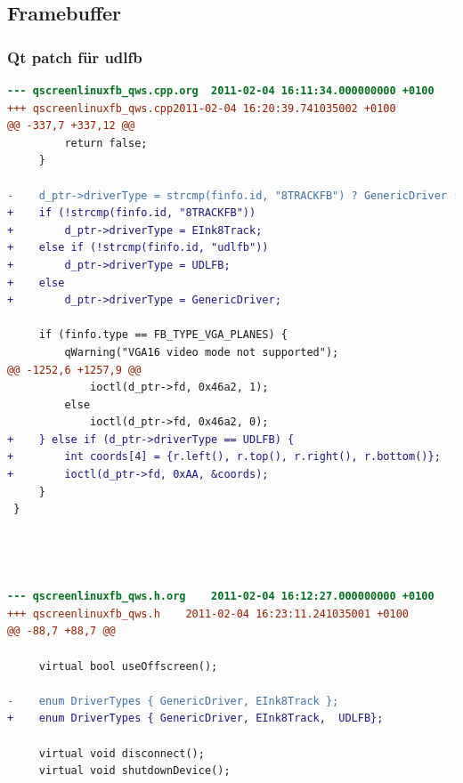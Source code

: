 \documentclass{beamer}
\begin{document}
  \subsection{Framebuffer}
	\begin{frame}
		\frametitle{Qt patch für udlfb}
		\begin{lstlisting}[language=diff, basicstyle=\tiny]
--- qscreenlinuxfb_qws.cpp.org	2011-02-04 16:11:34.000000000 +0100
+++ qscreenlinuxfb_qws.cpp2011-02-04 16:20:39.741035002 +0100
@@ -337,7 +337,12 @@
         return false;
     }
 
-    d_ptr->driverType = strcmp(finfo.id, "8TRACKFB") ? GenericDriver : EInk8Track;
+    if (!strcmp(finfo.id, "8TRACKFB"))
+        d_ptr->driverType = EInk8Track;
+    else if (!strcmp(finfo.id, "udlfb"))
+        d_ptr->driverType = UDLFB;
+    else
+        d_ptr->driverType = GenericDriver;
 
     if (finfo.type == FB_TYPE_VGA_PLANES) {
         qWarning("VGA16 video mode not supported");
@@ -1252,6 +1257,9 @@
             ioctl(d_ptr->fd, 0x46a2, 1);
         else
             ioctl(d_ptr->fd, 0x46a2, 0);
+    } else if (d_ptr->driverType == UDLFB) {
+        int coords[4] = {r.left(), r.top(), r.right(), r.bottom()};
+        ioctl(d_ptr->fd, 0xAA, &coords);
     }
 }



 
--- qscreenlinuxfb_qws.h.org	2011-02-04 16:12:27.000000000 +0100
+++ qscreenlinuxfb_qws.h	2011-02-04 16:23:11.241035001 +0100
@@ -88,7 +88,7 @@
 
     virtual bool useOffscreen();
 
-    enum DriverTypes { GenericDriver, EInk8Track };
+    enum DriverTypes { GenericDriver, EInk8Track,  UDLFB};
 
     virtual void disconnect();
     virtual void shutdownDevice();	
		\end{lstlisting}
	\end{frame}
\end{document}
